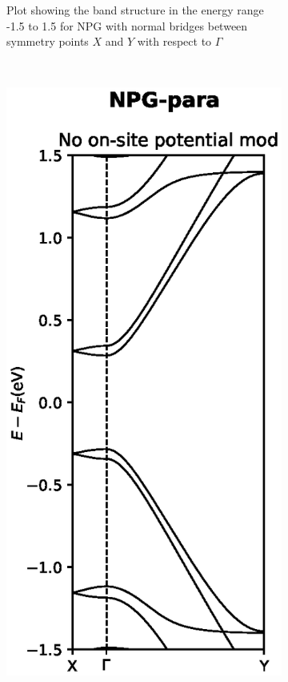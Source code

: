 \begin{figure}
\begin{subfigure}[b]{0.3\textwidth}
		\caption{Plot showing the band structure in the energy range -1.5 to 1.5 for NPG with normal bridges between symmetry points \(X\) and \(Y\) with respect to \(\Gamma\)}
		\label{Fabbs}
	\end{subfigure}
	~ %
	\begin{subfigure}[b]{0.3\textwidth}
		\includegraphics[width=\textwidth]{Figures/paraNPGBS.eps}

\end{subfigure}
\end{figure}
